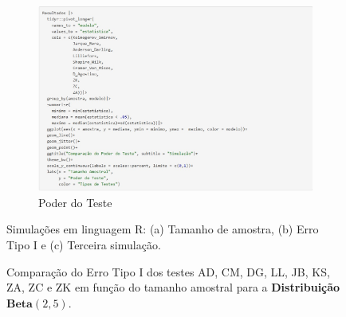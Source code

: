 \documentclass[final]{beamer}
\begin{document}
\begin{frame}[t]
\begin{columns}[t,totalwidth=0.6\paperwidth]
\begin{column}{0.45\textwidth}
\begin{figure}[H]
\begin{subfigure}[b]{0.33\linewidth}
        \centering
        \includegraphics[width=\linewidth]{fig3_simulacao.jpg}
        \caption{Poder do Teste}
        \label{fig:simulacao3}
    \end{subfigure}

    \caption{Simulações em linguagem R: (a) Tamanho de amostra, (b) Erro Tipo I e (c) Terceira simulação.}
    \label{fig:simulacoes}
\end{figure}


\begin{figure}[H]
    \centering
    \caption{Comparação do Erro Tipo I dos testes AD, CM, DG, LL, JB, KS, ZA, ZC e ZK
    em função do tamanho amostral para a \textbf{Distribuição} \(\textbf{Beta}(2,5)\).}
    \label{fig:erro_tipo_I_beta}


\end{figure}
\end{column}
\end{columns}
\end{frame}
\end{document}
